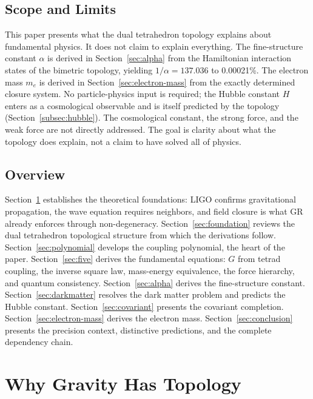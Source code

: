 \documentclass[aps,prd,preprint,superscriptaddress,showpacs,preprintnumbers,amsmath,amssymb,nofootinbib]{revtex4-2}
\begin{document}
\subsection{Scope and Limits}
\label{subsec:limits}

This paper presents what the dual tetrahedron topology explains about fundamental physics. It does not claim to explain everything. The fine-structure constant $\alpha$ is derived in Section~\ref{sec:alpha} from the Hamiltonian interaction states of the bimetric topology, yielding $1/\alpha = 137.036$ to 0.00021\%. The electron mass $m_e$ is derived in Section~\ref{sec:electron-mass} from the exactly determined closure system. No particle-physics input is required; the Hubble constant $H$ enters as a cosmological observable and is itself predicted by the topology (Section~\ref{subsec:hubble}). The cosmological constant, the strong force, and the weak force are not directly addressed. The goal is clarity about what the topology does explain, not a claim to have solved all of physics.

\subsection{Overview}
\label{subsec:structure}

Section~\ref{sec:theory} establishes the theoretical foundations: LIGO confirms gravitational propagation, the wave equation requires neighbors, and field closure is what GR already enforces through non-degeneracy. Section~\ref{sec:foundation} reviews the dual tetrahedron topological structure from which the derivations follow. Section~\ref{sec:polynomial} develops the coupling polynomial, the heart of the paper. Section~\ref{sec:five} derives the fundamental equations: $G$ from tetrad coupling, the inverse square law, mass-energy equivalence, the force hierarchy, and quantum consistency. Section~\ref{sec:alpha} derives the fine-structure constant. Section~\ref{sec:darkmatter} resolves the dark matter problem and predicts the Hubble constant. Section~\ref{sec:covariant} presents the covariant completion. Section~\ref{sec:electron-mass} derives the electron mass. Section~\ref{sec:conclusion} presents the precision context, distinctive predictions, and the complete dependency chain.

\section{Why Gravity Has Topology}
\label{sec:theory}
\end{document}
